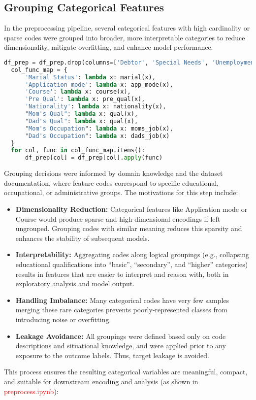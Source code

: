 \documentclass[twoside,final]{hcmut-report}
\begin{document}
\subsection*{Grouping Categorical Features}
In the preprocessing pipeline, several categorical features with high cardinality or sparse codes were grouped into broader, more interpretable categories to reduce dimensionality, mitigate overfitting, and enhance model performance.
\begin{lstlisting}[language=python]
  df_prep = df_prep.drop(columns=['Debtor', 'Special Needs', 'Unemployment rate', 'Inflation rate', 'GDP'])
  col_func_map = {
      'Marial Status': lambda x: marial(x),
      'Application mode': lambda x: app_mode(x),
      'Course': lambda x: course(x),
      'Pre Qual': lambda x: pre_qual(x),
      'Nationality': lambda x: nationality(x),
      "Mom's Qual": lambda x: qual(x),
      "Dad's Qual": lambda x: qual(x),
      "Mom's Occupation": lambda x: moms_job(x),
      "Dad's Occupation": lambda x: dads_job(x)
  }
  for col, func in col_func_map.items():
      df_prep[col] = df_prep[col].apply(func)
\end{lstlisting}
Grouping decisions were informed by domain knowledge and the dataset documentation, where feature codes correspond to specific educational, occupational, or administrative groups. The motivations for this step include:
\begin{itemize}
  \item \textbf{Dimensionality Reduction:} Categorical features like Application mode or Course would produce sparse and high-dimensional encodings if left ungrouped. Grouping codes with similar meaning reduces this sparsity and enhances the stability of subsequent models.
  \item \textbf{Interpretability:} Aggregating codes along logical groupings (e.g., collapsing educational qualifications into ``basic'', ``secondary'', and ``higher'' categories) results in features that are easier to interpret and reason with, both in exploratory analysis and model output.
  \item \textbf{Handling Imbalance:} Many categorical codes have very few samples merging these rare categories prevents poorly-represented classes from introducing noise or overfitting.
  \item \textbf{Leakage Avoidance:} All groupings were defined based only on code descriptions and situational knowledge, and were applied prior to any exposure to the outcome labels. Thus, target leakage is avoided.
\end{itemize}
This process ensures the resulting categorical variables are meaningful, compact, and suitable for downstream encoding and analysis (as shown in \textcolor{red}{preprocess.ipynb}):
\end{document}
